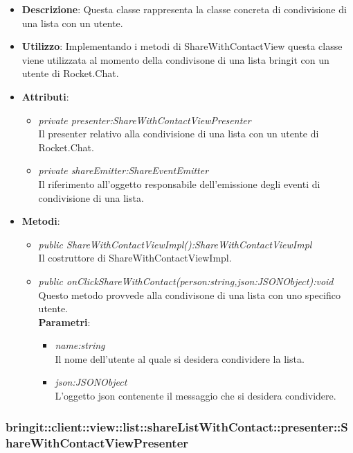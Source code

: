\begin{itemize}
\item \textbf{Descrizione}: Questa classe rappresenta la classe concreta di condivisione di una lista con un utente.
\item \textbf{Utilizzo}: Implementando i metodi di ShareWithContactView questa classe viene utilizzata al momento della condivisone di una lista bringit con un utente di Rocket.Chat.
\item \textbf{Attributi}: 
\begin{itemize}
	\item \textit{private presenter:ShareWithContactViewPresenter}\\
	Il presenter relativo alla condivisione di una lista con un utente di Rocket.Chat.
	\item \textit{private shareEmitter:ShareEventEmitter}\\
	Il riferimento all'oggetto responsabile dell'emissione degli eventi di condivisione di una lista.
\end{itemize}
\item \textbf{Metodi}:
	\begin{itemize}
	\item \textit{public ShareWithContactViewImpl():ShareWithContactViewImpl}\\
	Il costruttore di ShareWithContactViewImpl.
	\item \textit{public onClickShareWithContact(person:string,json:JSONObject):void}\\
	Questo metodo provvede alla condivisone di una lista con uno specifico utente.
					\\ \textbf{Parametri}: \begin{itemize}
			\item \textit{name:string}\\
			Il nome dell'utente al quale si desidera condividere la lista.
			\item \textit{json:JSONObject}\\
			L'oggetto json contenente il messaggio che si desidera condividere.
					\end{itemize} 
	\end{itemize}
\end{itemize} 

\subsubsection{bringit::client::view::list::shareListWithContact::presenter::ShareWithContactViewPresenter}

